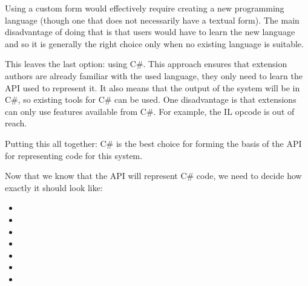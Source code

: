 Using a custom form would effectively require creating a new programming language (though one that does not necessarily have a textual form). The main disadvantage of doing that is that users would have to learn the new language and so it is generally the right choice only when no existing language is suitable.

This leaves the last option: using C\#. This approach ensures that extension authors are already familiar with the used language, they only need to learn the \ac{API} used to represent it. It also means that the output of the system will be in C\#, so existing tools for C\# can be used. One disadvantage is that extensions can only use features available from C\#. For example, the  \ac{IL} opcode is out of reach.

Putting this all together: C\# is the best choice for forming the basis of the \ac{API} for representing code for this system.

\medskip

Now that we know that the \ac{API} will represent C\# code, we need to decide how exactly it should look like:


\begin{itemize}
\item {}
\item {}
\item {}
\item {}
\item {}
\item {}
\item {}
\end{itemize}